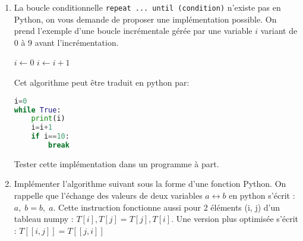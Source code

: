 \documentclass[a4paper, 12pt]{article}
\begin{document}
\begin{enumerate}
\begin{algorithmic}[1]
   \begin{multicols}{2}
        \State $ip, T \gets \Call{Partition}{$T, g, d$} $
         \State $T \gets \Call{Tri\_rapide}{$T, g, ip$} $
         \State $T \gets \Call{Tri\_rapide}{$T, ip+1, d$} $
    \EndIf
    \State \Return $T$
\EndFunction
\\
    \State $pivot \gets T[g]$
    \State $i \gets g-1$
    \State $j \gets d+1$
        \columnbreak
    \Repeat
    \State $j \gets j-1$

    \Repeat
    \State $i \gets i+1$
    \State $T \gets \Call{Echanger}{$T, i, j$} $ 
    \Else
    \State \Return $j, T$
    \EndIf
        \EndWhile
\EndFunction
\end{multicols}
\end{algorithmic}

Noter que le symbole $\rhd$ désigne le début d'un commentaire.

\item La boucle conditionnelle {\tt repeat ... until (condition)} n'existe pas en Python, on vous demande de proposer une implémentation possible. 
On prend l'exemple d'une boucle incrémentale gérée par une variable $i$ variant
de 0 à 9 avant l'incrémentation.

\newpage 

\begin{algorithmic}[1]
    \State $i \gets 0$
    \Repeat {}
    \State $i \gets i+1$  
\end{algorithmic}

Cet algorithme peut être traduit en python par:
\begin{lstlisting}[language=python]
i=0
while True:
	print(i)
	i=i+1
	if i==10:
		break
\end{lstlisting}
Tester cette implémentation dans un programme à part.

\item Implémenter l'algorithme suivant sous la forme d'une fonction Python. 
On rappelle que l'échange des valeurs de deux variables $a \leftrightarrow b$ en python s'écrit :
$a,\; b=b,\; a$. Cette instruction fonctionne aussi pour 2 éléments (i, j) d'un tableau numpy :
$T[i], T[j]= T[j], T[i]$. Une version plus optimisée s'écrit : $T[[i, j]]=T[[j, i]]$


\end{enumerate}
\end{document}
